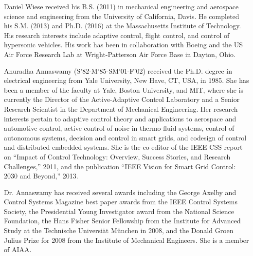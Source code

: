 \documentclass[journal]{IEEEtran}
\newcommand{\figurepath}{../fig/bio}
\begin{document}
  \onecolumn
  \begin{multicols}{2}

    \begin{IEEEbiography}{Daniel Wiese}
      received his B.S. (2011) in mechanical engineering and aerospace science and engineering from the University of California, Davis.
      He completed his S.M. (2013) and Ph.D. (2016) at the Massachusetts Institute of Technology.
      His research interests include adaptive control, flight control, and control of hypersonic vehicles.
      His work has been in collaboration with Boeing and the US Air Force Research Lab at Wright-Patterson Air Force Base in Dayton, Ohio.
    \end{IEEEbiography}

    \begin{IEEEbiography}{Anuradha Annaswamy}
      (S'82-M'85-SM'01-F'02) received the Ph.D. degree in electrical engineering from Yale University, New Have, CT, USA, in 1985.
      She has been a member of the faculty at Yale, Boston University, and MIT, where she is currently the Director of the Active-Adaptive Control Laboratory and a Senior Research Scientist in the Department of Mechanical Engineering.
      Her research interests pertain to adaptive control theory and applications to aerospace and automotive control, active control of noise in thermo-fluid systems, control of autonomous systems, decision and control in smart grids, and codesign of control and distributed embedded systems.
      She is the co-editor of the IEEE CSS report on ``Impact of Control Technology: Overview, Success Stories, and Research Challenges,'' 2011, and the publication ``IEEE Vision for Smart Grid Control: 2030 and Beyond,'' 2013.

      Dr. Annaswamy has received several awards including the George Axelby and Control Systems Magazine best paper awards from the IEEE Control Systems Society, the Presidential Young Investigator award from the National Science Foundation, the Hans Fisher Senior Fellowship from the Institute for Advanced Study at the Technische Universi{\"a}t M{\"u}nchen in 2008, and the Donald Groen Julius Prize for 2008 from the Institute of Mechanical Engineers.
      She is a member of AIAA.
    \end{IEEEbiography}


\end{multicols}
\end{document}
